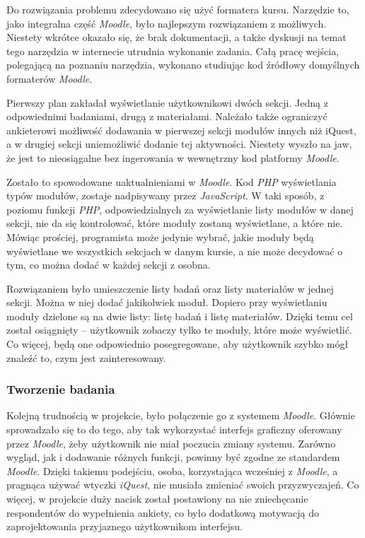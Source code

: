 Do rozwiązania problemu zdecydowano się użyć formatera kursu. Narzędzie to, jako integralna część \emph{Moodle}, było najlepszym rozwiązaniem z możliwych. Niestety wkrótce okazało się, że brak dokumentacji, a także dyskusji na temat tego narzędzia w internecie utrudnia wykonanie zadania. Całą pracę wejścia, polegającą na poznaniu narzędzia, wykonano studiując kod źródłowy domyślnych formaterów \emph{Moodle}.

Pierwszy plan zakładał wyświetlanie użytkownikowi dwóch sekcji. Jedną z odpowiednimi badaniami, drugą z materiałami. Należało także ograniczyć ankieterowi możliwość dodawania w pierwszej sekcji modułów innych niż iQuest, a w drugiej sekcji uniemożliwić dodanie tej aktywności. Niestety wyszło na jaw, że jest to nieosiągalne bez ingerowania w wewnętrzny kod platformy \emph{Moodle}. 

Zostało to spowodowane uaktualnieniami w \emph{Moodle}. Kod \emph{PHP} wyświetlania typów modułów, zostaje nadpisywany przez \emph{JavaScript}. W taki sposób, z poziomu funkcji \emph{PHP}, odpowiedzialnych za wyświetlanie listy modułów w danej sekcji, nie da się kontrolować, które moduły zostaną wyświetlane, a które nie. Mówiąc prościej, programista może jedynie wybrać, jakie moduły będą wyświetlane we wszystkich sekcjach w danym kursie, a nie może decydować o tym, co można dodać w każdej sekcji z osobna.

Rozwiązaniem było umieszczenie listy badań oraz listy materiałów w jednej sekcji. Można w niej dodać jakikolwiek moduł. Dopiero przy wyświetlaniu moduły dzielone są na dwie listy: listę badań i listę materiałów. Dzięki temu cel został osiągnięty -- użytkownik zobaczy tylko te moduły, które może wyświetlić. Co więcej, będą one odpowiednio posegregowane, aby użytkownik szybko mógł znaleźć to, czym jest zainteresowany.

\subsubsection{Tworzenie badania}
Kolejną trudnością w projekcie, było połączenie go z systemem \emph{Moodle}. Głównie sprowadzało się to do tego, aby tak wykorzystać interfejs graficzny oferowany przez \emph{Moodle}, żeby użytkownik nie miał poczucia zmiany systemu. Zarówno wygląd, jak i dodawanie różnych funkcji, powinny być zgodne ze standardem \emph{Moodle}. Dzięki takiemu podejściu, osoba, korzystająca wcześniej z \emph{Moodle}, a pragnąca używać wtyczki \emph{iQuest}, nie musiała zmieniać swoich przyzwyczajeń. Co więcej, w projekcie duży nacisk został postawiony na nie zniechęcanie respondentów do wypełnienia ankiety, co było dodatkową motywacją do zaprojektowania przyjaznego użytkownikom interfejsu.

